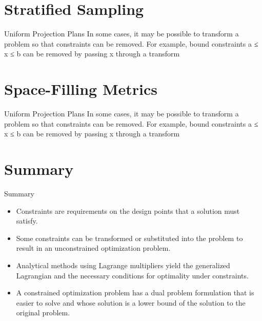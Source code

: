 \documentclass{beamer}
\begin{document}
\section{Stratified Sampling}
\begin{frame}{Uniform Projection Plans}
In some cases, it may be possible to transform a problem so that constraints can be removed. For example, bound constraints a ≤ x ≤ b can be removed by passing x through a transform


\end{frame}


\section{Space-Filling Metrics}
\begin{frame}{Uniform Projection Plans}
In some cases, it may be possible to transform a problem so that constraints can be removed. For example, bound constraints a ≤ x ≤ b can be removed by passing x through a transform


\end{frame}

\section{Summary}
\begin{frame}{Summary}
    \begin{itemize}
        \item Constraints are requirements on the design points that a solution must satisfy.
        \item Some constraints can be transformed or substituted into the problem to result in an unconstrained optimization problem.
        \item Analytical methods using Lagrange multipliers yield the generalized Lagrangian and the necessary conditions for optimality under constraints.
        \item A constrained optimization problem has a dual problem formulation that is easier to solve and whose solution is a lower bound of the solution to the original problem.
    \end{itemize}
\end{frame}
\end{document}
